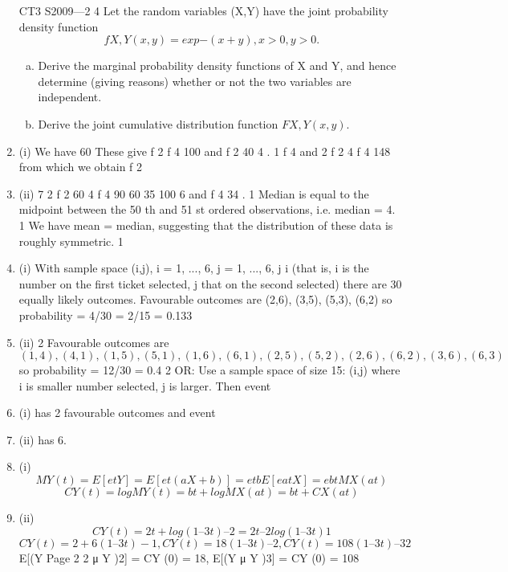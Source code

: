 \documentclass[a4paper,12pt]{article}
\begin{document}
\begin{enumerate}
CT3 S2009—2
4
Let the random variables (X,Y) have the joint probability density function
\[f X , Y ( x , y ) = exp{ − ( x + y )}, x > 0, y > 0.\]
\begin{enumerate}[(a)]
\item Derive the marginal probability density functions of X and Y, and hence determine (giving reasons) whether or not the two variables are independent.
\item Derive the joint cumulative distribution function $F X , Y ( x , y )$.
\end{enumerate}
\item (i)
We have 60
These give f 2
f 4 100 and
f 2
40
4 .
1
f 4 and 2 f 2 4 f 4 148
from which we obtain f 2
\item (ii)
7 2 f 2 60 4 f 4 90 60 35
100
6 and f 4
34 .
1
Median is equal to the midpoint between the 50 th and 51 st ordered observations, i.e. median = 4. 1
We have mean = median, suggesting that the distribution of these data is roughly symmetric. 1
\item (i)
With sample space {(i,j), i = 1, ..., 6, j = 1, ..., 6, j
i}
(that is, i is the number on the first ticket selected, j that on the second
selected) there are 30 equally likely outcomes.
Favourable outcomes are (2,6), (3,5), (5,3), (6,2)
so probability = 4/30 = 2/15 = 0.133
\item (ii)
2
Favourable outcomes are
\[(1,4), (4,1), (1,5), (5,1), (1,6), (6,1), (2,5), (5,2), (2,6), (6,2), (3,6), (6,3)\]
so probability = 12/30 = 0.4
2
OR: Use a sample space of size 15: {(i,j)} where i is smaller number selected,
j is larger.
Then event \item (i) has 2 favourable outcomes and event \item (ii) has 6.
\item (i)
\[MY (t) = E[etY ] = E[et(aX+b)] = etbE[eatX ] = ebtMX (at)\]
\[CY (t) = log MY (t) = bt + log MX (at) = bt + CX (at)\]
\item (ii)
\[CY (t) = 2t + log(1 – 3t) –2 = 2t – 2log(1 – 3t) 1\]
\[CY (t) = 2 + 6(1 – 3t)-1 , CY (t) = 18(1 – 3t) –2 , CY (t) = 108(1 – 3t) –3 2\]
E[(Y
Page 2
2
μ Y )2] = CY (0) = 18, E[(Y
μ Y )3] = CY (0) = 108

\end{enumerate}
\end{document}
